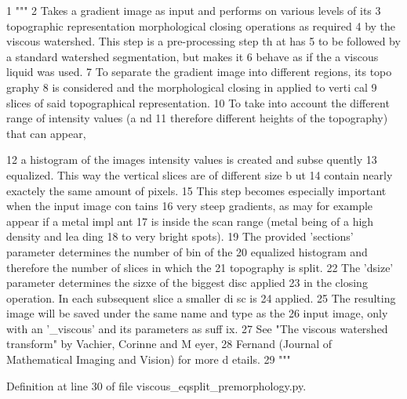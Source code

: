 \begin{DoxyCode}
1 """
2                   Takes a gradient image as input and performs on various levels 
      of its
3                   topographic representation morphological closing operations as 
      required
4                   by the viscous watershed. This step is a pre-processing step th
      at has
5                   to be followed by a standard watershed segmentation, but makes 
      it
6                   behave as if the a viscous liquid was used.
7                   To separate the gradient image into different regions, its topo
      graphy
8                   is considered and the morphological closing in applied to verti
      cal
9                   slices of said topographical representation.
10                   To take into account the different range of intensity values (a
      nd
11                   therefore different heights of the topography) that can appear,
      
12                   a histogram of the images intensity values is created and subse
      quently
13                   equalized. This way the vertical slices are of different size b
      ut
14                   contain nearly exactely the same amount of pixels.
15                   This step becomes especially important when the input image con
      tains
16                   very steep gradients, as may for example appear if a metal impl
      ant
17                   is inside the scan range (metal being of a high density and lea
      ding
18                   to very bright spots).
19                   The provided 'sections' parameter determines the number of bin 
      of the
20                   equalized histogram and therefore the number of slices in which
       the
21                   topography is split.
22                   The 'dsize' parameter determines the sizxe of the biggest disc 
      applied
23                   in the closing operation. In each subsequent slice a smaller di
      sc is
24                   applied.
25                   The resulting image will be saved under the same name and type 
      as the
26                   input image, only with an '_viscous' and its parameters as suff
      ix.
27                   See "The viscous watershed transform" by Vachier, Corinne and M
      eyer,
28                   Fernand (Journal of Mathematical Imaging and Vision) for more d
      etails.
29                   """
\end{DoxyCode}


Definition at line 30 of file viscous\_\-eqsplit\_\-premorphology.py.

